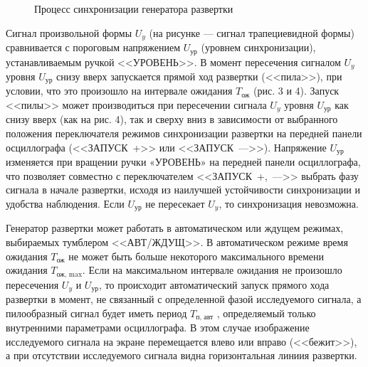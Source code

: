 \documentclass[14pt]{article}
\begin{document}
\begin{figure}[h!]
	\caption{Процесс синхронизации генератора развертки}
	\label{fig:image}
\end{figure}

Сигнал произвольной формы $U_y$ (на рисунке — сигнал трапециевидной формы) сравнивается с пороговым напряжением $U_{\text{ур}}$ (уровнем синхронизации), устанавливаемым ручкой <<УРОВЕНЬ>>. В момент пересечения сигналом $U_y$ уровня $U_{\text{ур}}$ снизу вверх запускается прямой ход развертки (<<пила>>), при условии, что это произошло на интервале ожидания $T_{\text{ож}}$ (рис. 3 и 4). Запуск <<пилы>> может производиться при пересечении сигнала $U_y$ уровня $U_{\text{ур}}$ как снизу вверх (как на рис. 4), так и сверху вниз в зависимости от выбранного положения переключателя режимов синхронизации развертки на передней панели осциллографа (<<ЗАПУСК~+>> или <<ЗАПУСК~--->>). Напряжение $U_{\text{ур}}$ изменяется при вращении ручки «УРОВЕНЬ» на передней панели осциллографа, что позволяет совместно с переключателем <<ЗАПУСК~+,~--->> выбрать фазу сигнала в начале развертки, исходя из наилучшей устойчивости синхронизации и удобства наблюдения. Если $U_{\text{ур}}$ не пересекает $U_y$, то синхронизация невозможна.

Генератор развертки может работать в автоматическом или ждущем режимах, выбираемых тумблером <<АВТ/ЖДУЩ>>. В автоматическом режиме время ожидания $T_{\text{ож}}$ не может быть больше некоторого максимального времени ожидания $T_{\text{ож, max}}$. Если на максимальном интервале ожидания не произошло пересечения $U_y$ и $U_{\text{ур}}$, то происходит автоматический запуск прямого хода развертки в момент, не связанный с определенной фазой исследуемого сигнала, а пилообразный сигнал будет иметь период $T_{\text{п, авт}}$ , определяемый только внутренними параметрами осциллографа. В этом случае изображение исследуемого сигнала на экране перемещается влево или вправо (<<бежит>>), а при отсутствии исследуемого сигнала видна горизонтальная линиия развертки.
\end{document}
